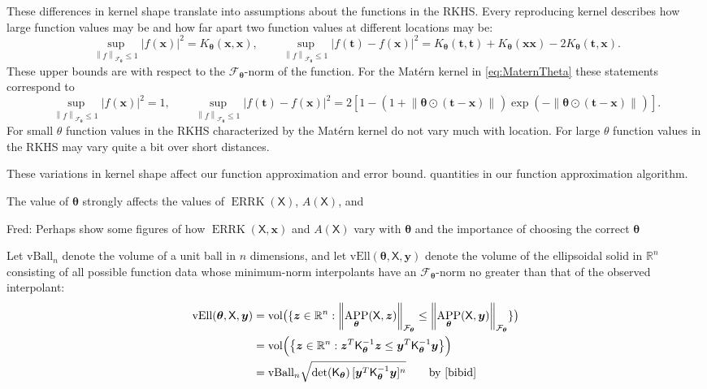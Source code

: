 \documentclass[]{mcom-l}
\theoremstyle{theorem}
\theoremstyle{remark}
\newcommand{\vBall}{\text{vBall}_n}
\newcommand{\vEll}{\text{vEll}}
\DeclareMathOperator{\vol}{vol}
\DeclareMathOperator{\errK}{ERRK}
\DeclareMathOperator{\APP}{APP}
\newcommand{\reals}{{\mathbb{R}}}
\newcommand{\mK}{\mathsf{K}}
\newcommand{\mX}{\mathsf{X}}
\newcommand{\bx}{{\boldsymbol{x}}}
\newcommand{\by}{{\boldsymbol{y}}}
\newcommand{\bt}{{\boldsymbol{t}}}
\newcommand{\bz}{{\boldsymbol{z}}}
\newcommand{\btheta}{{\boldsymbol{\theta}}}
\newcommand{\calf}{{\mathcal{F}}}
\def\abs#1{\ensuremath{\left \lvert #1 \right \rvert}}
\newcommand{\norm}[2][{}]{\ensuremath{\left \lVert #2 \right \rVert}_{#1}}
\newcommand{\FredNote}[1]{{\color{blue}Fred: #1}}
\begin{document}
These differences in kernel shape translate into assumptions about the functions in the RKHS.  Every reproducing kernel describes how large function values may be and how far apart two function values at different locations may be:
\begin{equation} \label{eq:diff_f}
\sup_{\norm[\calf_{\btheta}]{f} \le 1} \abs{f(\bx)}^2 = K_\btheta(\bx,\bx), \qquad    \sup_{\norm[\calf_{\btheta}]{f} \le 1} \abs{f(\bt) - f(\bx)}^2 = K_{\btheta}(\bt,\bt) +  K_{\btheta}(\bx\bx) - 2 K_{\btheta}(\bt,\bx).
\end{equation}
These upper bounds are with respect to the $\calf_\btheta$-norm of the function.  For the Mat\'ern kernel in \eqref{eq:MaternTheta} these statements correspond to 
\begin{equation} \label{eq:diff_f_Matern}
\sup_{\norm[\calf_{\btheta}]{f} \le 1} \abs{f(\bx)}^2 = 1, \qquad 
\sup_{\norm[\calf_{\btheta}]{f} \le 1} \abs{f(\bt) - f(\bx)}^2 = 2[1 - (1 +  \norm{\btheta \odot (\bt-\bx)}) \exp(-\norm{\btheta \odot (\bt-\bx)})].
\end{equation}
For small $\theta$ function values in the RKHS characterized by the Mat\'ern kernel do not vary much with location. For large $\theta$ function values in the RKHS may vary quite a bit over short distances.

These variations in kernel shape affect our function approximation and error bound. quantities in our function approximation algorithm.


The value of $\btheta$ strongly affects the values of $\errK(\mX)$, $A(\mX)$, and 

\FredNote{Perhaps show some figures of how $\errK(\mX,\bx)$ and $A(\mX)$ vary with $\btheta$ and the importance of choosing the correct $\btheta$}

Let $\vBall$ denote the volume of a unit ball in $n$ dimensions, and let $\vEll(\btheta,\mX,\by)$ denote the volume of the ellipsoidal solid in $\reals^n$ consisting of all possible function data whose minimum-norm interpolants have an $\calf_{\btheta}$-norm no greater than that of the observed interpolant:
\begin{align*}
\vEll(\btheta,\mX,\by) &= \vol\bigl(\{ \bz \in \reals^n : \norm[\calf_{\btheta}]{\APP_{\btheta}(\mX,\bz)}  \le \norm[\calf_{\btheta}]{\APP_{\btheta}(\mX,\by)} \} \bigr) \\
& = \vol\Bigl( \bigl \{ \bz \in \reals^n : \bz^T \mK_\btheta^{-1} \bz \le \by^T \mK_\btheta^{-1} \by  \bigr \} \Bigr) \\
& = \vBall \sqrt{\det(\mK_{\btheta})  \, [\by^T \mK_\btheta^{-1} \by]^n } \qquad \text{by \cite{bibid}}
\end{align*}
\end{document}
